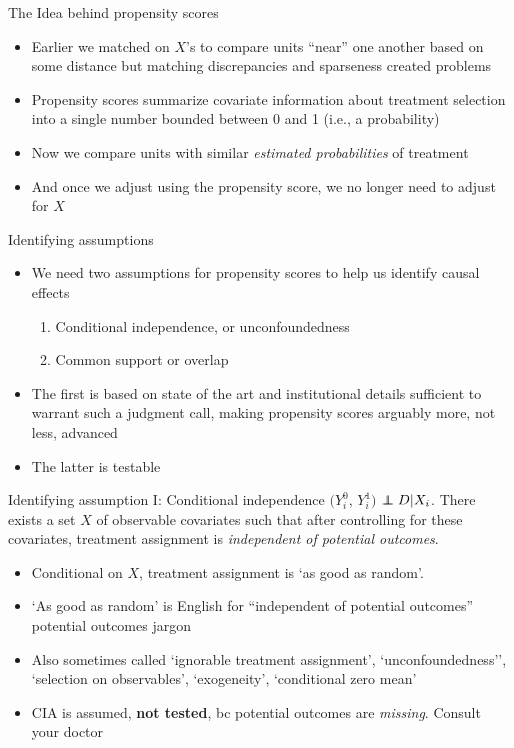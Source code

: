 \documentclass{beamer}
\newcommand\independent{\protect\mathpalette{\protect\independenT}{\perp}}
\def\independenT#1#2{\mathrel{\rlap{$#1#2$}\mkern2mu{#1#2}}}
\begin{document}
\begin{frame}{The Idea behind propensity scores}
	
	\begin{itemize}
	\item Earlier we matched on $X$'s to compare units ``near'' one another based on some distance but matching discrepancies and sparseness created problems
	\item Propensity scores summarize covariate information about treatment selection into a single number bounded between 0 and 1 (i.e., a probability)
	\item Now we compare units with similar \emph{estimated probabilities} of treatment
	\item And once we adjust using the propensity score, we no longer need to adjust for $X$
	\end{itemize}
\end{frame}

\begin{frame}{Identifying assumptions}

\begin{itemize}
\item We need two assumptions for propensity scores to help us identify causal effects
	\begin{enumerate}
	\item Conditional independence, or unconfoundedness
	\item Common support or overlap
	\end{enumerate}
\item The first is based on state of the art and institutional details sufficient to warrant such a judgment call, making propensity scores arguably more, not less, advanced
\item The latter is testable
\end{itemize}

\end{frame}

\begin{frame}[plain]

	\begin{block}{Identifying assumption I: Conditional independence}
	$(Y_i^0$, $Y_i^1)$ $\independent{D} | X_i$. There exists a set $X$ of observable covariates such that after controlling for these covariates, treatment assignment is \emph{independent of potential outcomes}.
	\end{block}
	
	\begin{itemize}
	\item Conditional on $X$, treatment assignment is `as good as random'. 
	\item `As good as random' is English for ``independent of potential outcomes'' potential outcomes jargon
	\item Also sometimes called `ignorable treatment assignment', `unconfoundedness'', `selection on observables', `exogeneity', `conditional zero mean'
	\item CIA is assumed, \textbf{not tested}, bc potential outcomes are \emph{missing}. Consult your doctor
	\end{itemize}
\end{frame}
\end{document}
